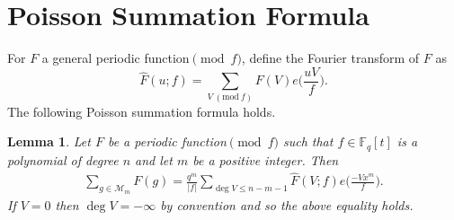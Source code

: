 \documentclass[12pt,reqno]{amsart}
\newcommand{\Mod}[1]{\ (\mathrm{mod}\ #1)}
\newcommand{\BF}{\mathbb{F}}
\newcommand{\CM}{\mathcal{M}}
\newtheorem{lem}{Lemma}[subsection]
\begin{document}
\section{Poisson Summation Formula}
For $F$ a general periodic function$\pmod f$, define the Fourier transform of $F$ as
$$
\widehat{F}(u; f)=  \sum\limits_{V\Mod f} F(V) e \Big (\frac{uV}{f} \Big ).
$$
The following Poisson summation formula holds. 
\begin{lem}\label{possionformula}
Let $F$ be a periodic function$\pmod f$ such that $f \in \BF_{q}[t]$ is a polynomial of degree $n$ and let $m$ be a positive integer. Then
    \begin{align}\label{poisson}
    \sum\limits_{g \in \CM_{m}}  F(g) = \frac{q^m}{|f|} \sum\limits_{\deg V \leq n-m-1} \widehat{F}(V;f)e \Big (\frac{-Vx^m}{f} \Big).       
    \end{align}
If $V=0$ then $\deg V = -\infty$ by convention and so the above equality holds. 
\end{lem}
\end{document}
